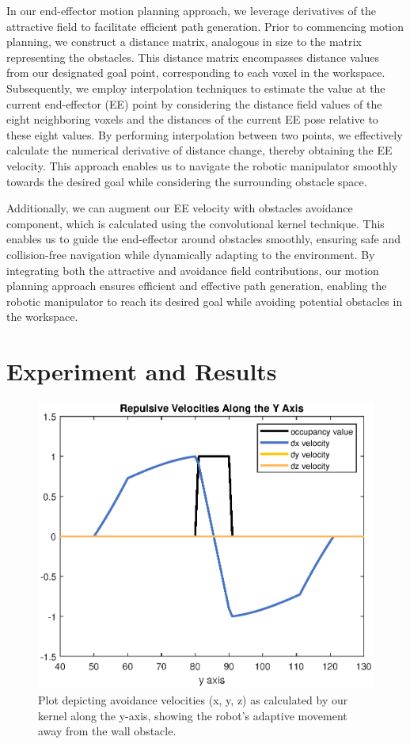 \documentclass[a4paper]{article}
\begin{document}
In our end-effector motion planning approach, we leverage derivatives of the attractive field to facilitate efficient path generation. Prior to commencing motion planning, we construct a distance matrix, analogous in size to the matrix representing the obstacles. This distance matrix encompasses distance values from our designated goal point, corresponding to each voxel in the workspace. Subsequently, we employ interpolation techniques to estimate the value at the current end-effector (EE) point by considering the distance field values of the eight neighboring voxels and the distances of the current EE pose relative to these eight values. By performing interpolation between two points, we effectively calculate the numerical derivative of distance change, thereby obtaining the EE velocity. This approach enables us to navigate the robotic manipulator smoothly towards the desired goal while considering the surrounding obstacle space.

Additionally, we can augment our EE velocity with obstacles avoidance component, which is calculated using the convolutional kernel technique. This enables us to guide the end-effector around obstacles smoothly, ensuring safe and collision-free navigation while dynamically adapting to the environment. By integrating both the attractive and avoidance field contributions, our motion planning approach ensures efficient and effective path generation, enabling the robotic manipulator to reach its desired goal while avoiding potential obstacles in the workspace.

\section{Experiment and Results}
	 	  
\begin{figure}[htbp]
	\centering
	\includegraphics[width=1.0\linewidth]{Repulsive-Velocities-Along-the-Y-Axis-wide.eps}
	\caption{Plot depicting avoidance velocities (x, y, z) as calculated by our kernel along the y-axis, showing the robot's adaptive movement away from the wall obstacle.}
	\label{y axis avoidance values}
\end{figure}
\end{document}
